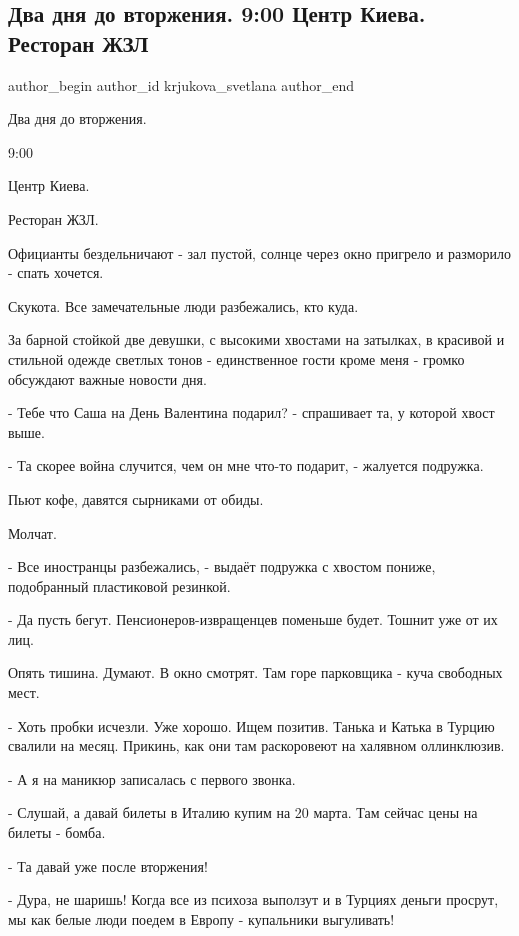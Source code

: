  
 
 
 
 
 
\subsection{Два дня до вторжения. 9:00 Центр Киева. Ресторан ЖЗЛ}
\label{sec:14_02_2022.fb.krjukova_svetlana.1.restoran_zhzl}
 
\ifcmt
 author_begin
   author_id krjukova_svetlana
 author_end
\fi

Два дня до вторжения. 

9:00

Центр Киева. 

Ресторан ЖЗЛ. 

Официанты бездельничают - зал пустой, солнце через окно пригрело и разморило -
спать хочется.

Скукота. Все замечательные люди разбежались, кто куда. 

За барной стойкой две девушки, с высокими хвостами на затылках, в красивой и
стильной одежде светлых тонов - единственное гости кроме меня - громко
обсуждают важные новости дня. 

- Тебе что Саша на День Валентина подарил? - спрашивает та, у которой  хвост
выше. 

- Та скорее война случится, чем он мне что-то подарит, - жалуется подружка. 

Пьют кофе, давятся сырниками от обиды. 

Молчат.

- Все иностранцы разбежались, - выдаёт подружка с хвостом пониже, подобранный
пластиковой резинкой. 

- Да пусть бегут. Пенсионеров-извращенцев поменьше будет. Тошнит уже от их лиц. 

Опять тишина. Думают. В окно смотрят. Там горе парковщика - куча свободных
мест. 

- Хоть пробки исчезли. Уже хорошо. Ищем позитив. Танька и Катька в Турцию
свалили на месяц. Прикинь, как они там раскоровеют на халявном оллинклюзив.

- А я на маникюр записалась с первого звонка. 

- Слушай, а давай билеты в Италию купим на 20 марта. Там сейчас цены на билеты
- бомба. 

- Та давай уже после вторжения! 

- Дура, не шаришь! Когда все из психоза выползут и в Турциях деньги просрут, мы
как белые люди поедем в Европу - купальники выгуливать!
